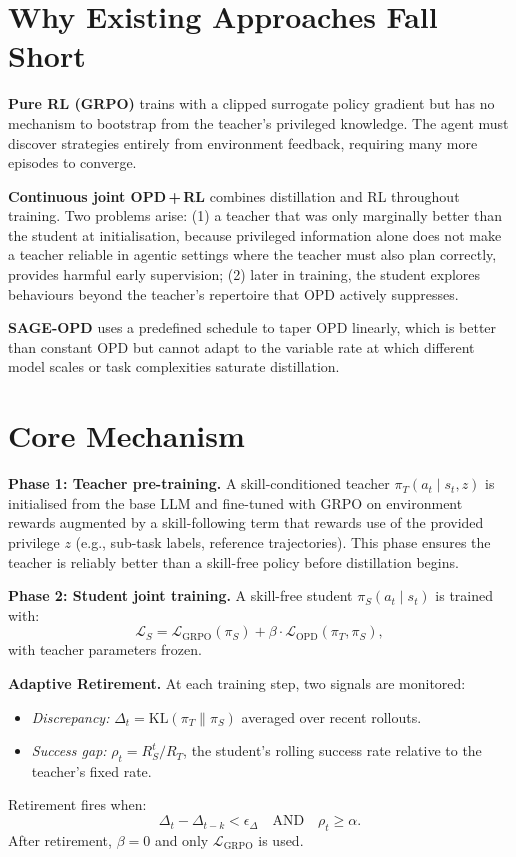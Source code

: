 \documentclass[10pt,twocolumn]{article}
\begin{document}
\section{Why Existing Approaches Fall Short}

\textbf{Pure RL (GRPO)} trains with a clipped surrogate policy gradient but
has no mechanism to bootstrap from the teacher's privileged knowledge. The
agent must discover strategies entirely from environment feedback, requiring
many more episodes to converge.

\textbf{Continuous joint OPD\,+\,RL} combines distillation and RL throughout
training. Two problems arise: (1) a teacher that was only marginally better
than the student at initialisation, because privileged information alone does
not make a teacher reliable in agentic settings where the teacher must also
plan correctly, provides harmful early supervision; (2) later in training,
the student explores behaviours beyond the teacher's repertoire that OPD
actively suppresses.

\textbf{SAGE-OPD} uses a predefined schedule to taper OPD linearly, which
is better than constant OPD but cannot adapt to the variable rate at which
different model scales or task complexities saturate distillation.

\section{Core Mechanism}

\textbf{Phase 1: Teacher pre-training.}
A skill-conditioned teacher $\pi_T(a_t \mid s_t, z)$ is initialised from
the base LLM and fine-tuned with GRPO on environment rewards augmented by
a skill-following term that rewards use of the provided privilege $z$
(e.g., sub-task labels, reference trajectories). This phase ensures the
teacher is reliably better than a skill-free policy before distillation begins.

\textbf{Phase 2: Student joint training.}
A skill-free student $\pi_S(a_t \mid s_t)$ is trained with:
\[
\mathcal{L}_S = \mathcal{L}_{\text{GRPO}}(\pi_S)
              + \beta \cdot \mathcal{L}_{\text{OPD}}(\pi_T, \pi_S),
\]
with teacher parameters frozen.

\textbf{Adaptive Retirement.}
At each training step, two signals are monitored:
\begin{itemize}[itemsep=1pt,parsep=0pt]
  \item \emph{Discrepancy:} $\Delta_t = \mathrm{KL}(\pi_T \| \pi_S)$
    averaged over recent rollouts.
  \item \emph{Success gap:} $\rho_t = R_S^t / R_T$, the student's rolling
    success rate relative to the teacher's fixed rate.
\end{itemize}
Retirement fires when:
\[
\Delta_t - \Delta_{t-k} < \epsilon_\Delta \quad \text{AND} \quad \rho_t \geq \alpha.
\]
After retirement, $\beta{=}0$ and only $\mathcal{L}_{\text{GRPO}}$ is used.
\end{document}
